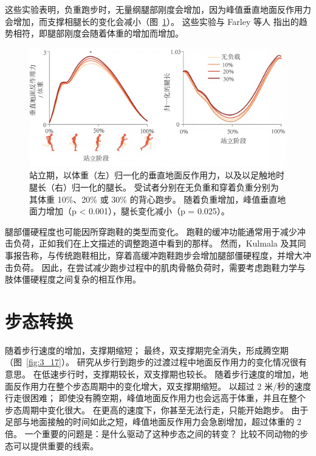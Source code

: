 这些实验表明，负重跑步时，无量纲腿部刚度会增加，因为峰值垂直地面反作用力会增加，而支撑相腿长的变化会减小（图~\ref{fig:3_16}）。
这些实验与 Farley 等人\cite{farley1993running} 指出的趋势相符，即腿部刚度会随着体重的增加而增加。

\begin{figure}[!htb]
	\centering
	\includegraphics[width=1.0\linewidth]{chap3/3_16}
	\caption{站立期，以体重（左）归一化的垂直地面反作用力，以及以足触地时腿长（右）归一化的腿长。
		受试者分别在无负重和穿着负重分别为其体重 10\%、20\% 或 30\% 的背心跑步。
		随着负重增加，峰值垂直地面力增加（p < 0.001），腿长变化减小（p = 0.025）\cite{silder2015running}。 \label{fig:3_16}}
\end{figure}

腿部僵硬程度也可能因所穿跑鞋的类型而变化。
跑鞋的缓冲功能通常用于减少冲击负荷，正如我们在上文描述的调整跑道中看到的那样。
然而，Kulmala 及其同事\cite{kulmala2018running}报告称，与传统跑鞋相比，穿着高缓冲跑鞋跑步会增加腿部僵硬程度，并增大冲击负荷。
因此，在尝试减少跑步过程中的肌肉骨骼负荷时，需要考虑跑鞋力学与肢体僵硬程度之间复杂的相互作用。


\section{步态转换}

随着步行速度的增加，支撑期缩短；
最终，双支撑期完全消失，形成腾空期（图~\ref{fig:3_17}）。
研究从步行到跑步的过渡过程中地面反作用力的变化情况很有意思。
在低速步行时，支撑期较长，双支撑期也较长。
随着步行速度的增加，地面反作用力在整个步态周期中的变化增大，双支撑期缩短。
以超过 2 米/秒的速度行走很困难；
即使没有腾空期，峰值地面反作用力也会远高于体重，并且在整个步态周期中变化很大。
在更高的速度下，你甚至无法行走，只能开始跑步。
由于足部与地面接触的时间如此之短，峰值地面反作用力会急剧增加，超过体重的 2 倍。
一个重要的问题是：是什么驱动了这种步态之间的转变？
比较不同动物的步态可以提供重要的线索。


